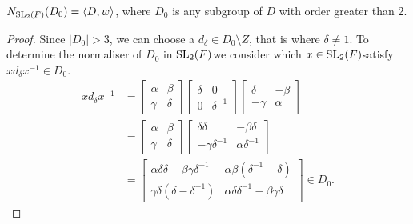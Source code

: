 \begin{proposition}
\label{normalizer_subgroup_D_eq_DW}
\leanok
    $N_{\operatorname{SL}_2(F)}(D_0) = \langle D , w \rangle$, where  $D_0$ is any subgroup of $D$ with order greater than 2. \\
    \end{proposition}
    
    \begin{proof} Since $|D_0| > 3$, we can choose a $d_\delta \in D_0 \! \setminus \! Z$, that is where $\delta \neq 1$. To determine the normaliser of $D_0$ in $\operatorname{SL}_2(F)$we consider which $x \in \operatorname{SL}_2(F)$satisfy $x d_\delta x^{-1} \in D_0$.
        \begin{align}\label{6.3proof3} xd_\delta x^{-1} &= \begin{bmatrix} \alpha & \beta \\ \gamma & \delta \end{bmatrix} \begin{bmatrix} \delta & 0 \\ 0 & \delta^{-1} \end{bmatrix} \begin{bmatrix} \delta & - \beta \\ - \gamma & \alpha \end{bmatrix} \nonumber \\[1.5ex]
        &= \begin{bmatrix} \alpha & \beta \\ \gamma & \delta \end{bmatrix} \begin{bmatrix} \delta \delta & - \beta \delta \\ - \gamma \delta^{-1} & \alpha \delta^{-1} \end{bmatrix} \nonumber \\[1.5ex]
        &= \begin{bmatrix} \alpha \delta \delta - \beta \gamma \delta^{-1} & \alpha \beta (\delta^{-1} - \delta) \\ \gamma \delta (\delta - \delta^{-1}) & \alpha \delta \delta^{-1} - \beta \gamma \delta \end{bmatrix} \in D_0.
        \end{align}
        

\end{proof}
